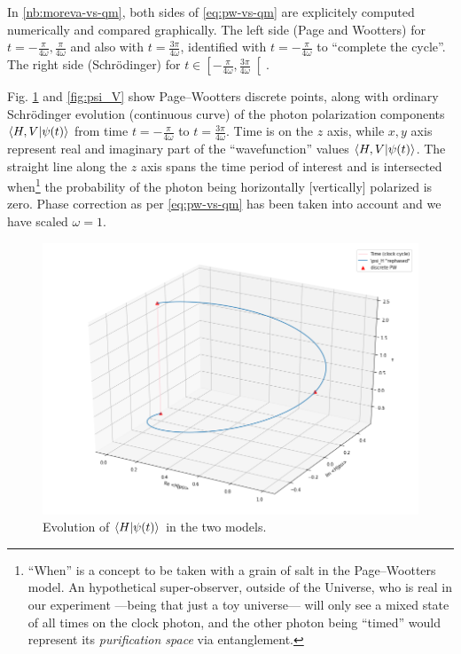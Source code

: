 \begin{spacing}{1.5}
  In \ref{nb:moreva-vs-qm},
  both sides of \eqref{eq:pw-vs-qm} are
  explicitely computed numerically and compared graphically.
  The left side (Page and Wootters)
  for $t = -\frac{\pi}{4\omega}, \frac{\pi}{4\omega}$ and also with
  $t = \frac{3\pi}{4\omega}$, identified with $t = -\frac{\pi}{4\omega}$
  to ``complete the cycle''.
  The right side (Schr{\"o}dinger) for
  $t \in \left[-\frac{\pi}{4\omega}, \frac{3\pi}{4\omega}\right[$.
\end{spacing}

Fig. \ref{fig:psi_H} and \ref{fig:psi_V} show
Page--Wootters discrete points, along with
ordinary Schr{\"o}dinger evolution (continuous curve)
of the photon polarization components
$\braket{H,V}{\psi(t)}$
from time $t = -\frac{\pi}{4\omega}$
to $t = \frac{3\pi}{4\omega}$. Time is on the $z$ axis,
while $x, y$ axis represent real and imaginary part of
the ``wavefunction'' values $\braket{H,V}{\psi(t)}$.
The straight line along the $z$ axis
spans the time period of interest
and is intersected when\footnote{
  ``When'' is a concept to be taken with a grain of salt in the Page--Wootters model.
  An hypothetical super-observer, outside of the Universe,
  who is real in our experiment ---being that just a toy universe---
  will only see a mixed state of all times on the clock photon, and the other
  photon being ``timed'' would represent its \emph{purification space}
  via entanglement.
}
the probability of the photon being
horizontally [vertically] polarized is zero.
Phase correction as per \eqref{eq:pw-vs-qm} has been taken into account
and we have scaled $\omega=1$.

\begin{figure}
  \includegraphics[width=\textwidth]{img/psi_H.png}
  \caption{
    Evolution of $\braket{H}{\psi(t)}$ in the two models.
  }
  \label{fig:psi_H}
\end{figure}

